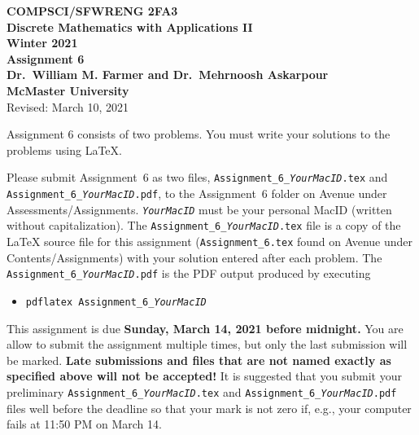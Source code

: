 \documentclass[11pt,fleqn]{article}
\begin{document}
	
	\begin{center}
		
		{\large \textbf{COMPSCI/SFWRENG 2FA3}}\\[2mm]
		{\large \textbf{Discrete Mathematics with Applications II}}\\[2mm]
		{\large \textbf{Winter 2021}}\\[8mm]
		{\huge \textbf{Assignment 6}}\\[6mm]
		{\large \textbf{Dr.~William M. Farmer and Dr.~Mehrnoosh Askarpour}}\\[2mm]
		{\large \textbf{McMaster University}}\\[6mm]
		{\large Revised: March 10, 2021}
		
	\end{center}
	
	\medskip
	
	Assignment 6 consists of two problems.  You must write your solutions
	to the problems using LaTeX.
	
	Please submit Assignment~6 as two files,
	\texttt{Assignment\_6\_\emph{YourMacID}.tex} and
	\texttt{Assignment\_6\_\emph{YourMacID}.pdf}, to the Assignment~6
	folder on Avenue under Assessments/Assignments.
	\texttt{\emph{YourMacID}} must be your personal MacID (written without
	capitalization).  The \texttt{Assignment\_6\_\emph{YourMacID}.tex}
	file is a copy of the LaTeX source file for this assignment
	(\texttt{Assignment\_6.tex} found on Avenue under
	Contents/Assignments) with your solution entered after each problem.
	The \texttt{Assignment\_6\_\emph{YourMacID}.pdf} is the PDF output
	produced by executing
	
	\begin{itemize}
		
		\item[] \texttt{pdflatex Assignment\_6\_\emph{YourMacID}}
		
	\end{itemize}
	
	This assignment is due \textbf{Sunday, March 14, 2021 before midnight.}
	You are allow to submit the assignment multiple times, but only the
	last submission will be marked.  \textbf{Late submissions and files
		that are not named exactly as specified above will not be accepted!}
	It is suggested that you submit your preliminary
	\texttt{Assignment\_6\_\emph{YourMacID}.tex} and
	\texttt{Assignment\_6\_\emph{YourMacID}.pdf} files well before the
	deadline so that your mark is not zero if, e.g., your computer fails
	at 11:50 PM on March 14.
	
\end{document}
